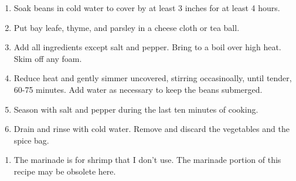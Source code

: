 


\begin{ingredients}
\end{ingredients}


\begin{recipe}
  \begin{enumerate}

  \item Soak beans in cold water to cover by at least 3 inches for at
    least 4 hours.

  \item Put bay leafe, thyme, and parsley in a cheese cloth or tea ball.

  \item Add all ingredients except salt and pepper.  Bring to a boil
    over high heat.  Skim off any foam.

  \item Reduce heat and gently simmer uncovered, stirring
    occasinoally, until tender, 60-75 minutes.  Add water as necessary
    to keep the beans submerged.

  \item Season with salt and pepper during the last ten minutes of
    cooking.

  \item Drain and rinse with cold water.  Remove and discard the
    vegetables and the spice bag.

  \end{enumerate}
\end{recipe}



\begin{ingredients}
\end{ingredients}


\begin{recipe}
  \begin{enumerate}

  \item The marinade is for shrimp that I don't use.  The marinade
    portion of this recipe may be obsolete here.

  \end{enumerate}
\end{recipe}



